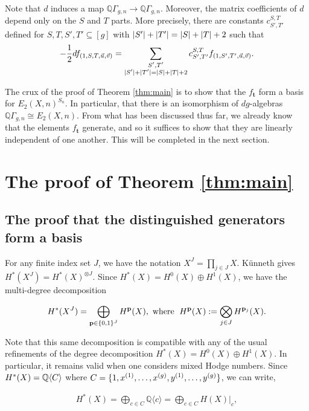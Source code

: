 \documentclass[11pt,reqno]{amsproc}
\numberwithin{equation}{section}
\theoremstyle{definition}
\theoremstyle{remark}
\newcommand\Q{{\mathbb Q}}
\newcommand\subeq{\subseteq}
\DeclarePairedDelimiter{\abs}{\lvert}{\rvert}
\DeclarePairedDelimiter{\set}{\{}{\}}
\DeclarePairedDelimiter{\pairing}{\langle}{\rangle}
\newcommand{\spp}[1]{^{(#1)}}
\begin{document}
Note that $d$ induces a map $\Q\Gamma_{g,n}\to \Q\Gamma_{g,n}$. Moreover, the matrix coefficients of $d$ depend only on the $S$ and $T$ parts. More precisely, there are constants $c^{S,T}_{S',T'}$ defined for $S,T,S',T'\subeq [g]$ with $\abs{S'}+\abs{T'}=\abs{S}+\abs{T}+2$ such that
\begin{equation} \label{eq:TheC's}
    -\frac12 df_{(1,S,T,\vec u,\vec v)}=\sum_{\substack{S',T'\\\abs{S'}+\abs{T'}=\abs{S}+\abs{T}+2}} c^{S,T}_{S',T'}f_{(1,S',T',\vec u,\vec v)}.
\end{equation}


The crux of the proof of Theorem \ref{thm:main} is to show that the $f_\mathbf{t}$ form a basis for $E_2(X,n)^{S_n}$. In particular, that there is an isomorphism of $dg$-algebras $\Q\Gamma_{g,n} \cong E_2(X,n)$. From what has been discussed thus far, we already know that the elements $f_\mathbf{t}$ generate, and so it suffices to show that they are linearly independent of one another. This will be completed in the next section.

\section{The proof of Theorem \ref{thm:main}}

\subsection{The proof that the distinguished generators form a basis}

For any finite index set $J$, we have the notation $X^J=\prod_{j\in J}X$. K\"unneth gives $H^*(X^J)=H^*(X)^{\otimes J}$. Since $H^*(X)=H^0(X)\oplus H^1(X)$, we have the multi-degree decomposition

\begin{align*}
    H^*(X^J)=\bigoplus_{\mathbf{p}\in \set{0,1}^J} H^{\mathbf{p}}(X), \text{ where }\; H^{\mathbf{p}}(X):=\bigotimes_{j\in J} H^{\mathbf{p}_j}(X).
\end{align*}

Note that this same decomposition is compatible with any of the usual refinements of the degree decomposition $H^*(X)=H^0(X)\oplus H^1(X)$. In particular, it remains valid when one considers mixed Hodge numbers.  Since $H^*(X)=\Q\pairing{C}$ where
$C=\set{1,x\spp{1},\dots,x\spp{g},y\spp{1},\dots,y\spp{g}}$, we can write,

\begin{align*}
H^*(X)=\bigoplus_{c\in C} \mathbb{Q}\langle c \rangle = \bigoplus_{c\in C} H(X)|_{c},
\end{align*}
\end{document}
